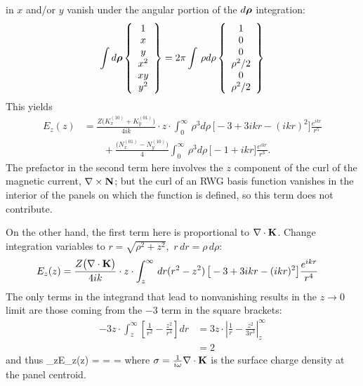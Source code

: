 in $x$ and/or $y$ vanish under the angular portion of the $d\boldsymbol{\rho}$
integration:
$$ \int d\boldsymbol{\rho} 
   \left\{ \begin{array}{c} 1 \\ x \\ y \\ x^2 \\xy \\y^2 \end{array}
   \right\}
   =2\pi \int \, \rho d\rho 
   \left\{ \begin{array}{c} 1 \\ 0 \\ 0 \\ \rho^2/2 \\ 0 \\ \rho^2/2 \end{array}
   \right\}
$$
This yields
\begin{align*}
 E_z(z) 
&= \frac{Z \big( K_x^{(10)} + K_y^{(01)} \big)}{4ik}  
   \cdot z \cdot \int_0^\infty \, \rho^3 d\rho \, \big[-3 + 3ikr - (ikr)^2\big] 
   \frac{e^{ikr}}{r^5}
\\
&\qquad
 + \frac{\big( N_x^{(01)} - N_y^{(10)} \big)}{4}  
   \int_0^\infty \, \rho^3 d\rho \, \big[-1 + ikr ] 
   \frac{e^{ikr}}{r^3}.
\end{align*}
The prefactor in the second term here involves the $z$ component of the 
curl of the magnetic current, $\nabla \times \mathbf{N}$; but the curl of an 
RWG basis function vanishes in the interior of the panels on which the 
function is defined, so this term does not contribute.

On the other hand, the first term here is proportional to $\nabla \cdot \mathbf{K}$.
Change integration variables to 
$r=\sqrt{\rho^2 + z^2}, \,\, r\,dr = \rho\, d\rho:$
\begin{align*}
 E_z(z) 
&= \frac{Z \big (\nabla \cdot \mathbf{K} \big)}{4ik} 
   \cdot z \cdot \int_z^\infty \, dr (r^2 - z^2) \, \big[-3 + 3ikr - (ikr)^2\big] 
   \frac{e^{ikr}}{r^4}
\end{align*}
The only terms in the integrand that lead to nonvanishing results in the 
$z\to 0$ limit are those coming from the $-3$ term in the square brackets:
\begin{align*}
 -3z\cdot \int_z^\infty \left[ \frac{1}{r^2} - \frac{z^2}{r^4} \right]dr 
&=
  3z\cdot\left| \frac{1}{r} - \frac{z^2}{3r^3} \right|_{z}^\infty
\\
&=2
\end{align*}
and thus 
{
   \lim_{z}E_z(z) 
   =  
   =  
   = \frac{\sigma}{2\epsilon}
}
where $\sigma=\frac{1}{i\omega}\nabla \cdot \mathbf{K}$ is 
the surface charge density at the panel centroid. 

